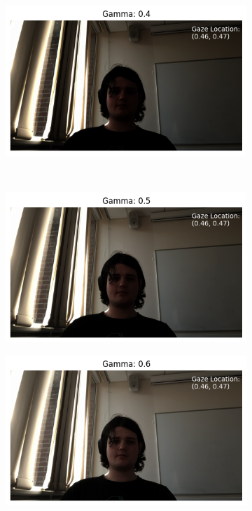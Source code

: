 \documentclass{report}
\begin{document}
\begin{figure}[h]
\begin{subfigure}{0.4\textwidth}
    \end{subfigure}%
    \begin{subfigure}{0.4\textwidth}
      \centering
      \includegraphics[width=\linewidth]{../assets/lighting-experiment/gamma-0.4.png}
    \end{subfigure}\\[1em]
    \begin{subfigure}{0.4\textwidth}
      \centering
      \includegraphics[width=\linewidth]{../assets/lighting-experiment/gamma-0.5.png}
    \end{subfigure}%
    \begin{subfigure}{0.4\textwidth}
      \centering
      \includegraphics[width=\linewidth]{../assets/lighting-experiment/gamma-0.6.png}

\end{subfigure}
\end{figure}
\end{document}
